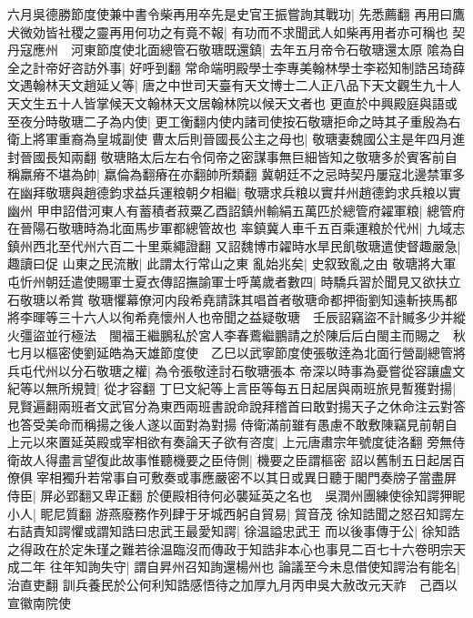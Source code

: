 六月吳德勝節度使兼中書令柴再用卒先是史官王振嘗詢其戰功|{
	先悉薦翻}
再用曰鷹犬微効皆社稷之靈再用何功之有竟不報|{
	有功而不求聞武人如柴再用者亦可稱也}
契丹寇應州　河東節度使北面總管石敬瑭既還鎮|{
	去年五月帝令石敬瑭還太原}
隂為自全之計帝好咨訪外事|{
	好呼到翻}
常命端明殿學士李專美翰林學士李崧知制誥呂琦薛文遇翰林天文趙延乂等|{
	唐之中世司天臺有天文博士二人正八品下天文觀生九十人天文生五十人皆掌候天文翰林天文居翰林院以候天文者也}
更直於中興殿庭與語或至夜分時敬瑭二子為内使|{
	更工衡翻内使内諸司使按石敬瑭拒命之時其子重殷為右衛上將軍重裔為皇城副使}
曹太后則晉國長公主之母也|{
	敬瑭妻魏國公主是年四月進封晉國長知兩翻}
敬瑭賂太后左右令伺帝之密謀事無巨細皆知之敬瑭多於賓客前自稱羸瘠不堪為帥|{
	羸倫為翻瘠在亦翻帥所類翻}
冀朝廷不之忌時契丹屢寇北邊禁軍多在幽拜敬瑭與趙德鈞求益兵運粮朝夕相繼|{
	敬瑭求兵粮以實幷州趙德鈞求兵粮以實幽州}
甲申詔借河東人有蓄積者菽粟乙酉詔鎮州輸絹五萬匹於總管府糴軍粮|{
	總管府在晉陽石敬瑭時為北面馬步軍都總管故也}
率鎮冀人車千五百乘運粮於代州|{
	九域志鎮州西北至代州六百二十里乘繩證翻}
又詔魏博市糴時水旱民飢敬瑭遣使督趣嚴急|{
	趣讀曰促}
山東之民流散|{
	此謂太行常山之東}
亂始兆矣|{
	史叙致亂之由}
敬瑭將大軍屯忻州朝廷遣使賜軍士夏衣傳詔撫諭軍士呼萬歲者數四|{
	時驕兵習於聞見又欲扶立石敬瑭以希賞}
敬瑭懼幕僚河内段希堯請誅其唱首者敬瑭命都押衙劉知遠斬挾馬都將李暉等三十六人以徇希堯懷州人也帝聞之益疑敬瑭　壬辰詔竊盜不計贓多少并縱火彊盜並行極法　閩福王繼鵬私於宮人李春鷰繼鵬請之於陳后后白閩主而賜之　秋七月以樞密使劉延皓為天雄節度使　乙巳以武寧節度使張敬逹為北面行營副總管將兵屯代州以分石敬瑭之權|{
	為令張敬逹討石敬瑭張本}
帝深以時事為憂嘗從容讓盧文紀等以無所規贊|{
	從才容翻}
丁巳文紀等上言臣等每五日起居與兩班旅見暫獲對揚|{
	見賢遍翻兩班者文武官分為東西兩班書說命說拜稽首曰敢對揚天子之休命注云對答也答受美命而稱揚之後人遂以面對為對揚}
侍衛滿前雖有愚慮不敢敷陳竊見前朝自上元以來置延英殿或宰相欲有奏論天子欲有咨度|{
	上元唐肅宗年號度徒洛翻}
旁無侍衛故人得盡言望復此故事惟聽機要之臣侍側|{
	機要之臣謂樞密}
詔以舊制五日起居百僚俱宰相獨升若常事自可敷奏或事應嚴密不以其日或異日聽于閣門奏牓子當盡屏侍臣|{
	屏必郢翻又卑正翻}
於便殿相待何必襲延英之名也　吳潤州團練使徐知諤狎眤小人|{
	眤尼質翻}
游燕廢務作列肆于牙城西躬自貿易|{
	貿音茂}
徐知誥聞之怒召知諤左右詰責知諤懼或謂知誥曰忠武王最愛知諤|{
	徐温謚忠武王}
而以後事傳于公|{
	徐知誥之得政在於定朱瑾之難若徐温臨沒而傳政于知誥非本心也事見二百七十六卷明宗天成二年}
往年知詢失守|{
	謂自昇州召知詢還楊州也}
論議至今未息借使知諤治有能名|{
	治直吏翻}
訓兵養民於公何利知誥感悟待之加厚九月丙申吳大赦改元天祚　己酉以宣徽南院使

